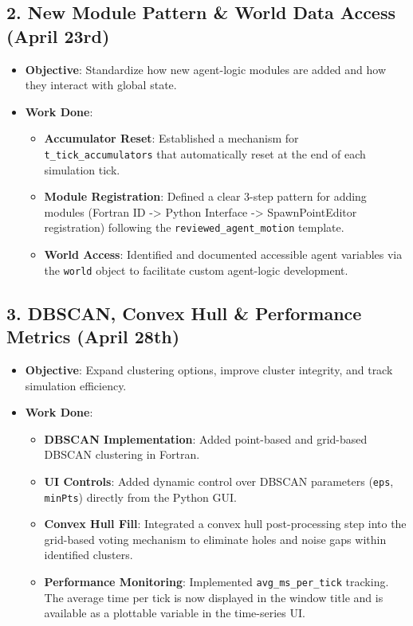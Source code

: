 \subsection{2. New Module Pattern \& World Data Access (April 23rd)}
\begin{itemize}
\item \textbf{Objective}: Standardize how new agent-logic modules are added and how they interact with global state.
\item \textbf{Work Done}:
\begin{itemize}
\item \textbf{Accumulator Reset}: Established a mechanism for \texttt{t\_tick\_accumulators} that automatically reset at the end of each simulation tick.
\item \textbf{Module Registration}: Defined a clear 3-step pattern for adding modules (Fortran ID -> Python Interface -> SpawnPointEditor registration) following the \texttt{reviewed\_agent\_motion} template.
\item \textbf{World Access}: Identified and documented accessible agent variables via the \texttt{world} object to facilitate custom agent-logic development.
\end{itemize}
\end{itemize}

\subsection{3. DBSCAN, Convex Hull \& Performance Metrics (April 28th)}
\begin{itemize}
\item \textbf{Objective}: Expand clustering options, improve cluster integrity, and track simulation efficiency.
\item \textbf{Work Done}:
\begin{itemize}
\item \textbf{DBSCAN Implementation}: Added point-based and grid-based DBSCAN clustering in Fortran.
\item \textbf{UI Controls}: Added dynamic control over DBSCAN parameters (\texttt{eps}, \texttt{minPts}) directly from the Python GUI.
\item \textbf{Convex Hull Fill}: Integrated a convex hull post-processing step into the grid-based voting mechanism to eliminate holes and noise gaps within identified clusters.
\item \textbf{Performance Monitoring}: Implemented \texttt{avg\_ms\_per\_tick} tracking. The average time per tick is now displayed in the window title and is available as a plottable variable in the time-series UI.
\end{itemize}
\end{itemize}

